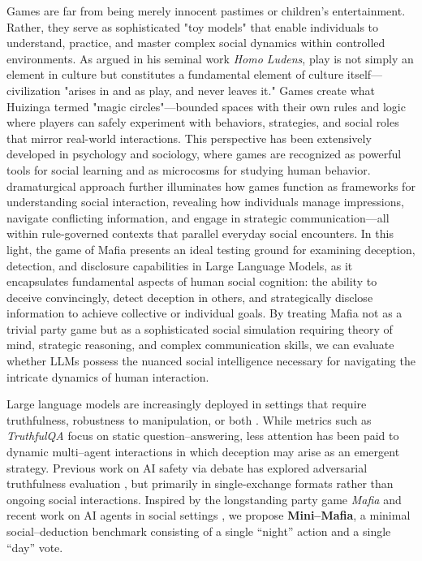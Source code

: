 \documentclass{article}
\begin{document}
Games are far from being merely innocent pastimes or children's entertainment. Rather, they serve as sophisticated "toy models" that enable individuals to understand, practice, and master complex social dynamics within controlled environments. As \citet{huizinga1938homo} argued in his seminal work \emph{Homo Ludens}, play is not simply an element in culture but constitutes a fundamental element of culture itself—civilization "arises in and as play, and never leaves it." Games create what Huizinga termed "magic circles"—bounded spaces with their own rules and logic where players can safely experiment with behaviors, strategies, and social roles that mirror real-world interactions. This perspective has been extensively developed in psychology and sociology, where games are recognized as powerful tools for social learning \citep{bandura1977social, raybourn2004applying} and as microcosms for studying human behavior. \citet{goffman1961encounters, goffman1974frame} dramaturgical approach further illuminates how games function as frameworks for understanding social interaction, revealing how individuals manage impressions, navigate conflicting information, and engage in strategic communication—all within rule-governed contexts that parallel everyday social encounters. In this light, the game of Mafia presents an ideal testing ground for examining deception, detection, and disclosure capabilities in Large Language Models, as it encapsulates fundamental aspects of human social cognition: the ability to deceive convincingly, detect deception in others, and strategically disclose information to achieve collective or individual goals. By treating Mafia not as a trivial party game but as a sophisticated social simulation requiring theory of mind, strategic reasoning, and complex communication skills, we can evaluate whether LLMs possess the nuanced social intelligence necessary for navigating the intricate dynamics of human interaction.



Large language models are increasingly deployed in settings that require truthfulness, robustness to manipulation, or both \citep{bubeck2023sparks, perez2023discovering}.  While metrics such as \emph{TruthfulQA} focus on static question--answering, less attention has been paid to dynamic multi--agent interactions in which deception may arise as an emergent strategy. Previous work on AI safety via debate has explored adversarial truthfulness evaluation \citep{irving2018ai}, but primarily in single-exchange formats rather than ongoing social interactions. Inspired by the longstanding party game \emph{Mafia} and recent work on AI agents in social settings \citep{park2023generative}, we propose \textbf{Mini--Mafia}, a minimal social--deduction benchmark consisting of a single ``night'' action and a single ``day'' vote.
\end{document}
